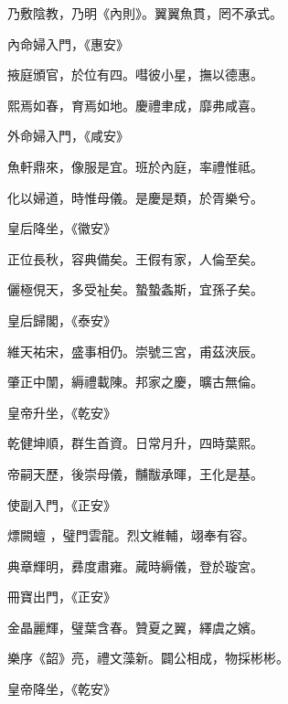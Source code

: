\begin{pinyinscope}
 乃敷陰教，乃明《內則》。翼翼魚貫，罔不承式。



 內命婦入門，《惠安》



 掖庭頒官，於位有四。嘒彼小星，撫以德惠。



 熙焉如春，育焉如地。慶禮聿成，靡弗咸喜。



 外命婦入門，《咸安》



 魚軒鼎來，像服是宜。班於內庭，率禮惟祗。



 化以婦道，時惟母儀。是慶是類，於胥樂兮。



 皇后降坐，《徽安》



 正位長秋，容典備矣。王假有家，人倫至矣。



 儷極俔天，多受祉矣。蟄蟄螽斯，宜孫子矣。



 皇后歸閣，《泰安》



 維天祐宋，盛事相仍。崇號三宮，甫茲浹辰。



 肇正中闈，縟禮載陳。邦家之慶，曠古無倫。



 皇帝升坐，《乾安》



 乾健坤順，群生首資。日常月升，四時葉熙。



 帝嗣天歷，後崇母儀，黼黻承暉，王化是基。



 使副入門，《正安》


熛闕蟺
 ，璧門雲龍。烈文維輔，翊奉有容。



 典章輝明，彞度肅雍。蕆時縟儀，登於璇宮。



 冊寶出門，《正安》



 金晶麗輝，璧葉含春。贊夏之翼，繹虞之嬪。



 樂序《韶》亮，禮文藻新。闢公相成，物採彬彬。



 皇帝降坐，《乾安》




\end{pinyinscope}
